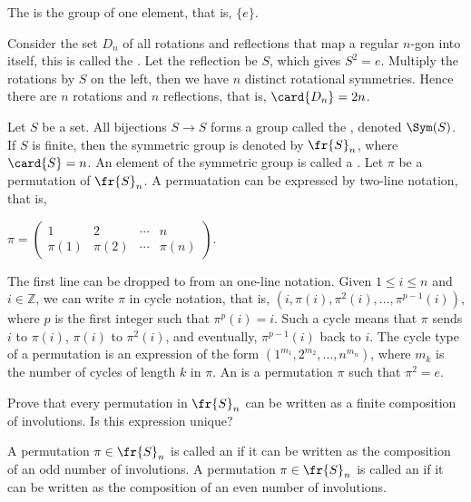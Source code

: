 \documentclass[10pt]{article}
\begin{document}
\begin{example}
    The  is the group of one element, that is, $\{e\}$.
\end{example}
\begin{example}
    Consider the set ${D}_{n}$ of all rotations and reflections that map a regular $n$-gon into itself, this is called the . Let the reflection be $S$, which gives ${S}^{2}=e$. Multiply the rotations by $S$ on the left, then we have $n$ distinct rotational symmetries. Hence there are $n$ rotations and $n$ reflections, that is, $\card{{D}_{n}}=2n$.
\end{example}
\begin{example}
    Let $S$ be a set. All bijections $S\to S$ forms a group called the , denoted $\Sym(S)$. If $S$ is finite, then the symmetric group is denoted by ${\fr{S}}_{n}$, where $\card{S}=n$. An element of the symmetric group is called a . Let $\pi$ be a permutation of ${\fr{S}}_{n}$. A permuatation can be expressed by two-line notation, that is, 
    \begin{center}
        $\pi=
        \begin{pmatrix}
            1 & 2 & \cdots & n \\
            \pi(1) & \pi(2) & \cdots & \pi(n)
        \end{pmatrix}$.
    \end{center}
    The first line can be dropped to from an one-line notation. Given $1\le i\le n$ and $i\in\mathbb{Z}$, we can write $\pi$ in cycle notation, that is, $(i,\pi(i),{\pi}^{2}(i),\ldots,{\pi}^{p-1}(i))$, where $p$ is the first integer such that ${\pi}^{p}(i)=i$. Such a cycle means that $\pi$ sends $i$ to $\pi(i)$, $\pi(i)$ to ${\pi}^{2}(i)$, and eventually, ${\pi}^{p-1}(i)$ back to $i$. The cycle type of a permutation is an expression of the form $({1}^{{m}_{1}},{2}^{{m}_{2}},\ldots,{n}^{{m}_{n}})$, where ${m}_{k}$ is the number of cycles of length $k$ in $\pi$. An  is a permutation $\pi$ such that ${\pi}^{2}=e$.
\end{example}
\begin{problem}
    Prove that every permutation in ${\fr{S}}_{n}$ can be written as a finite composition of involutions. Is this expression unique?
\end{problem}
\begin{definition}
    A permutation $\pi\in{\fr{S}}_{n}$ is called an  if it can be written as the composition of an odd number of involutions. A permutation $\pi\in{\fr{S}}_{n}$ is called an  if it can be written as the composition of an even number of involutions.
\end{definition}
\end{document}
